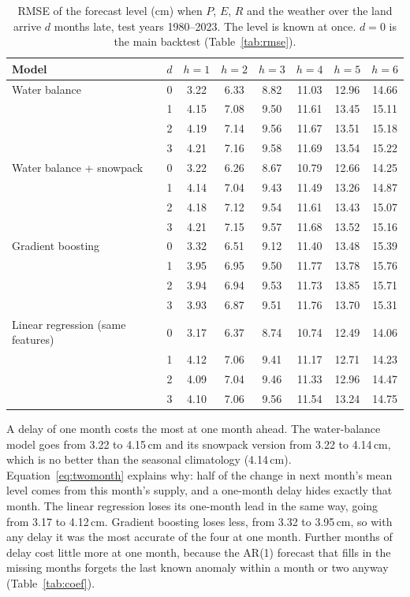 \documentclass{article}
\begin{document}
\begin{table}[htbp]
\centering
\caption{RMSE of the forecast level (cm) when $P$, $E$, $R$ and the weather over the land arrive
$d$ months late, test years 1980--2023. The level is known at once. $d = 0$ is the main backtest
(Table~\ref{tab:rmse}).}
\label{tab:delay}
\small
\begin{tabular}{||l|c|c|c|c|c|c|c||}
\hline\hline
Model & $d$ & $h=1$ & $h=2$ & $h=3$ & $h=4$ & $h=5$ & $h=6$ \\
\hline\hline
Water balance & 0 & 3.22 & 6.33 & 8.82 & 11.03 & 12.96 & 14.66 \\
& 1 & 4.15 & 7.08 & 9.50 & 11.61 & 13.45 & 15.11 \\
& 2 & 4.19 & 7.14 & 9.56 & 11.67 & 13.51 & 15.18 \\
& 3 & 4.21 & 7.16 & 9.58 & 11.69 & 13.54 & 15.22 \\
\hline
Water balance + snowpack & 0 & 3.22 & 6.26 & 8.67 & 10.79 & 12.66 & 14.25 \\
& 1 & 4.14 & 7.04 & 9.43 & 11.49 & 13.26 & 14.87 \\
& 2 & 4.18 & 7.12 & 9.54 & 11.61 & 13.43 & 15.07 \\
& 3 & 4.21 & 7.15 & 9.57 & 11.68 & 13.52 & 15.16 \\
\hline
Gradient boosting & 0 & 3.32 & 6.51 & 9.12 & 11.40 & 13.48 & 15.39 \\
& 1 & 3.95 & 6.95 & 9.50 & 11.77 & 13.78 & 15.76 \\
& 2 & 3.94 & 6.94 & 9.53 & 11.73 & 13.85 & 15.71 \\
& 3 & 3.93 & 6.87 & 9.51 & 11.76 & 13.70 & 15.31 \\
\hline
Linear regression (same features) & 0 & 3.17 & 6.37 & 8.74 & 10.74 & 12.49 & 14.06 \\
& 1 & 4.12 & 7.06 & 9.41 & 11.17 & 12.71 & 14.23 \\
& 2 & 4.09 & 7.04 & 9.46 & 11.33 & 12.96 & 14.47 \\
& 3 & 4.10 & 7.06 & 9.56 & 11.54 & 13.24 & 14.75 \\
\hline\hline
\end{tabular}
\end{table}

A delay of one month costs the most at one month ahead. The water-balance model goes from 3.22
to 4.15\,cm and its snowpack version from 3.22 to 4.14\,cm, which is no better than the seasonal
climatology (4.14\,cm). Equation~\ref{eq:twomonth} explains why: half of the change in next
month's mean level comes from this month's supply, and a one-month delay hides exactly that month.
The linear regression loses its one-month lead in the same way, going from 3.17 to 4.12\,cm.
Gradient boosting loses less, from 3.32 to 3.95\,cm, so with any delay it was the most accurate of
the four at one month. Further months of delay cost little more at one month, because the AR(1)
forecast that fills in the missing months forgets the last known anomaly within a month or two
anyway (Table~\ref{tab:coef}).
\end{document}
